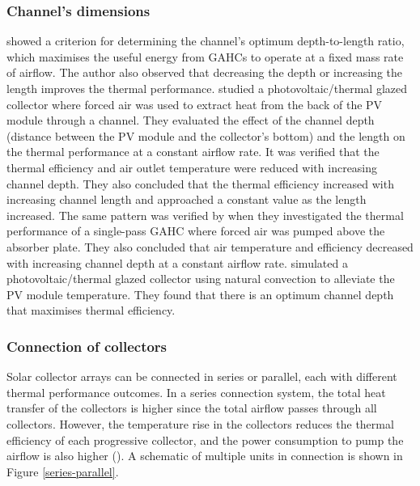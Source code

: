 \subsubsection{Channel's dimensions}

\citet{Hegazy1999} showed a criterion for determining the channel's optimum depth-to-length ratio, which maximises the useful energy from GAHCs to operate at a fixed mass rate of airflow. The author also observed that decreasing the depth or increasing the length improves the thermal performance. \citet{Tonui2007} studied a photovoltaic/thermal glazed collector where forced air was used to extract heat from the back of the PV module through a channel. They evaluated the effect of the channel depth (distance between the PV module and the collector's bottom) and the length on the thermal performance at a constant airflow rate. It was verified that the thermal efficiency and air outlet temperature were reduced with increasing channel depth. They also concluded that the thermal efficiency increased with increasing channel length and approached a constant value as the length increased. The same pattern was verified by \citet{Yousef2008} when they investigated the thermal performance of a single-pass GAHC where forced air was pumped above the absorber plate. They also concluded that air temperature and efficiency decreased with increasing channel depth at a constant airflow rate. \citet{Tonui2008} simulated a photovoltaic/thermal glazed collector using natural convection to alleviate the PV module temperature. They found that there is an optimum channel depth that maximises thermal efficiency.

\subsubsection{Connection of collectors}

Solar collector arrays can be connected in series or parallel, each with different thermal performance outcomes. In a series connection system, the total heat transfer of the collectors is higher since the total airflow passes through all collectors. However, the temperature rise in the collectors reduces the thermal efficiency of each progressive collector, and the power consumption to pump the airflow is also higher (\cite{Hastings2000}). A schematic of multiple units in connection is shown in Figure \ref{series-parallel}. 


